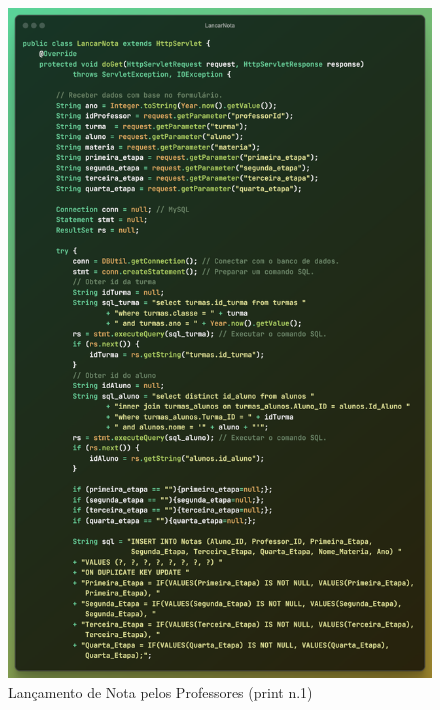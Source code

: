 \documentclass[main.tex]{subfiles}
\begin{document}
\begin{figure}[H]
    \centering
    \includegraphics[scale=0.6]{imagens/code_scrs/4-lancarNota1.png}
    \caption{Lançamento de Nota pelos Professores (print n.1)}
\end{figure}
\end{document}
